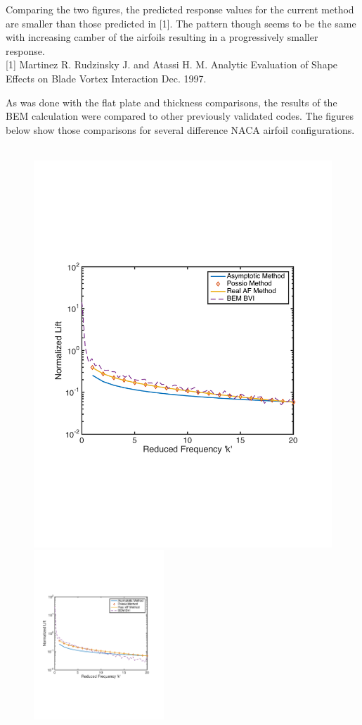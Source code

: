 \documentclass{article}
\begin{document}
\noindent Comparing the two figures, the predicted response values for the current method are smaller than those predicted in [1]. The pattern though seems to be the same with increasing camber of the airfoils resulting in a progressively smaller response. \\


[1] Martinez  R.   Rudzinsky  J.   and Atassi  H.  M.    Analytic Evaluation of Shape Effects on Blade Vortex Interaction  Dec.  1997.

\newpage

\noindent As was done with the flat plate and thickness comparisons, the results of the BEM calculation were compared to other previously validated codes. The figures below show those comparisons for several difference NACA airfoil configurations. \\ \\ 

\begin{figure}[h]
\centering
\begin{minipage}{0.5\textwidth}
	\centering
	\includegraphics[width = 3.5 in, height = 2.5 in]{NACA1101}
\end{minipage}%
\begin{minipage}{0.5\textwidth}
	\centering
	\includegraphics[width = 3.4 in, height = 2.5in]{NACA2101}
\end{minipage}%
\end{figure}
\end{document}
